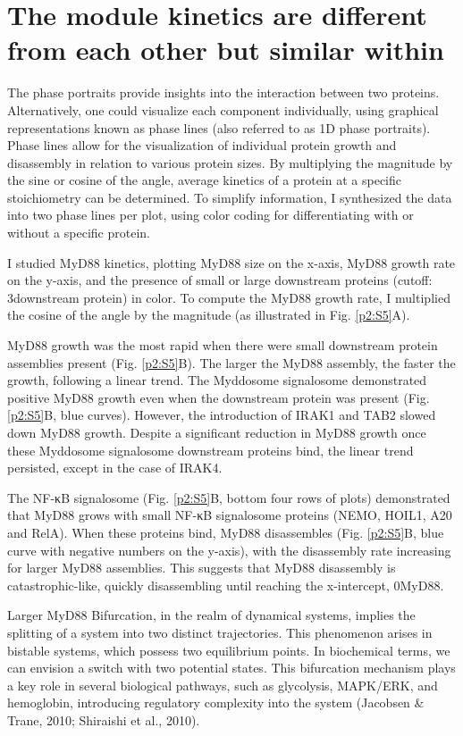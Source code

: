 \section{The module kinetics are different from each other but similar within}
The phase portraits provide insights into the interaction between two proteins. Alternatively, one could visualize each component individually, using graphical representations known as phase lines (also referred to as 1D phase portraits). Phase lines allow for the visualization of individual protein growth and disassembly in relation to various protein sizes. By multiplying the magnitude by the sine or cosine of the angle, average kinetics of a protein at a specific stoichiometry can be determined. To simplify information, I synthesized the data into two phase lines per plot, using color coding for differentiating with or without a specific protein.

I studied MyD88 kinetics, plotting MyD88 size on the x-axis, MyD88 growth rate on the y-axis, and the presence of small or large downstream proteins (cutoff: 3\times downstream protein) in color. To compute the MyD88 growth rate, I multiplied the cosine of the angle by the magnitude (as illustrated in Fig. \ref{p2:S5}A).

MyD88 growth was the most rapid when there were small downstream protein assemblies present (Fig. \ref{p2:S5}B). The larger the MyD88 assembly, the faster the growth, following a linear trend. The Myddosome signalosome demonstrated positive MyD88 growth even when the downstream protein was present (Fig. \ref{p2:S5}B, blue curves). However, the introduction of IRAK1 and TAB2 slowed down MyD88 growth. Despite a significant reduction in MyD88 growth once these Myddosome signalosome downstream proteins bind, the linear trend persisted, except in the case of IRAK4.

The NF-κB signalosome (Fig. \ref{p2:S5}B, bottom four rows of plots) demonstrated that MyD88 grows with small NF-κB signalosome proteins (NEMO, HOIL1, A20 and RelA). When these proteins bind, MyD88 disassembles (Fig. \ref{p2:S5}B, blue curve with negative numbers on the y-axis), with the disassembly rate increasing for larger MyD88 assemblies. This suggests that MyD88 disassembly is catastrophic-like, quickly disassembling until reaching the x-intercept, 0\times MyD88.

Larger MyD88 Bifurcation, in the realm of dynamical systems, implies the splitting of a system into two distinct trajectories. This phenomenon arises in bistable systems, which possess two equilibrium points. In biochemical terms, we can envision a switch with two potential states. This bifurcation mechanism plays a key role in several biological pathways, such as glycolysis, MAPK/ERK, and hemoglobin, introducing regulatory complexity into the system (Jacobsen \& Trane, 2010; Shiraishi et al., 2010).

